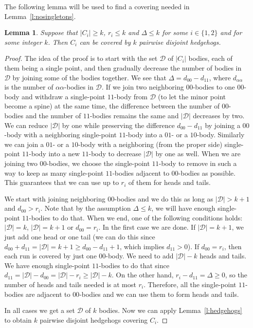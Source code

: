 \documentclass[12pt]{article}
\newtheorem{lemma}[theorem]{Lemma}
\begin{document}
\bigskip

The following lemma will be used to find a covering needed in 
Lemma~\ref{l:nosingletons}.

\begin{lemma}\label{l:paths}
Suppose that $|C_i|\geq k$, $r_i\leq k$ and $\Delta\leq k$ for some $i\in
\{1, 2\}$ and for some integer $k$. Then $C_i$ can be covered by $k$ pairwise
disjoint hedgehogs.
\end{lemma}

\begin{proof}
The idea of the proof is to start with the set $\mathcal{D}$ of $|C_i|$
bodies, each of them being a single point, and then gradually decrease the 
number of bodies in $\mathcal{D}$ by joining some of the bodies together.
We see that $\Delta=d_{00}-d_{11}$, where $d_{\alpha\alpha}$ is the number of
$\alpha\alpha$-bodies in $\mathcal{D}$. If we join two neighboring $00$-bodies to one
$00$-body and withdraw a single-point $11$-body from $\mathcal{D}$ (to let the
minor point become a spine) at the same time, the difference between the number
of $00$-bodies and the number of $11$-bodies remains the same and
$|\mathcal{D}|$ decreases by two. We can reduce $|\mathcal{D}|$ by one
while preserving the difference $d_{00}-d_{11}$
by joining a $00$-body with a neighboring single-point
$11$-body into a $01$- or a $10$-body. Similarly we can join a $01$- or
a $10$-body with a neighboring (from the proper side) single-point $11$-body
into a new $11$-body to decrease $|\mathcal{D}|$ by one as well. When we are
joining two $00$-bodies, we choose the single-point $11$-body to remove in such
a way to keep as many single-point $11$-bodies adjacent to $00$-bodies as
possible. This guarantees that we can use up to $r_i$ of them for heads and
tails.

We start with joining neighboring $00$-bodies and we do this as long as
$|\mathcal{D}|>k+1$ and $d_{00}>r_i$. Note that by the assumption 
$\Delta\leq k$, we will have enough single-point $11$-bodies to do that.
When we end, one of the following conditions holds: $|\mathcal{D}|=k$,
$|\mathcal{D}|=k+1$ or $d_{00}=r_i$. In the first case we are done. If
$|\mathcal{D}|=k+1$, we just add one head or one tail (we can do this since
$d_{00}+d_{11}=|\mathcal{D}|=k+1 \geq d_{00}-d_{11}+1$, which implies
$d_{11}>0$). If $d_{00}=r_i$, then each run is covered by just one $00$-body.
We need to add $|\mathcal{D}|-k$ heads and tails. We have enough
single-point $11$-bodies to do that since 
$d_{11}=|\mathcal{D}|-d_{00}=|\mathcal{D}|-r_i \geq |\mathcal{D}|-k$.
On the other hand, $r_i-d_{11}=\Delta \geq 0$, so the number of heads and
tails needed is at most $r_i$. Therefore, all the single-point $11$-bodies are
adjacent to $00$-bodies and we can use them to form heads and tails.

In all cases we get a set $\mathcal{D}$ of $k$ bodies. Now we can apply
Lemma~\ref{l:hedgehogs} to obtain $k$ pairwise disjoint hedgehogs covering
$C_i$.
\end{proof}
\end{document}
